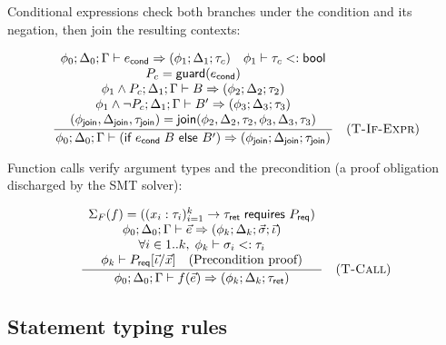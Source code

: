 Conditional expressions check both branches under the condition and its negation, then join the resulting contexts:

$$
  \frac{
    \begin{array}{c}
      \phi_0; \Delta_0; \Gamma \vdash e_\textsf{cond} \Rightarrow (\phi_1; \Delta_1; \tau_c) \quad \phi_1 \vdash \tau_c <: \textsf{bool} \\
      P_c = \mathsf{guard}(e_\textsf{cond}) \\
      \phi_1 \wedge P_c; \Delta_1; \Gamma \vdash B \Rightarrow (\phi_2; \Delta_2; \tau_2)                      \\
      \phi_1 \wedge \neg P_c; \Delta_1; \Gamma \vdash B' \Rightarrow (\phi_3; \Delta_3; \tau_3)                \\
      (\phi_\textsf{join}, \Delta_\textsf{join}, \tau_\textsf{join}) = \textsf{join}(\phi_2, \Delta_2, \tau_2, \phi_3, \Delta_3, \tau_3)
    \end{array}
  }{
    \phi_0; \Delta_0; \Gamma \vdash (\textsf{if } e_\textsf{cond}\; B \textsf{ else } B') \Rightarrow (\phi_\textsf{join}; \Delta_\textsf{join}; \tau_\textsf{join})
  } \quad (\textsc{T-If-Expr})
$$

Function calls verify argument types and the precondition (a proof obligation discharged by the SMT solver):

$$
  \frac{
    \begin{array}{c}
      \Sigma_F(f) = ( (x_i:\tau_i)_{i=1}^k \rightarrow \tau_\textsf{ret}\; \textsf{requires } P_\textsf{req} )                                  \\
      \phi_0; \Delta_0; \Gamma \vdash \vec{e} \Rightarrow (\phi_k; \Delta_k; \vec{\sigma}; \vec{\iota}) \\
      \forall i \in 1..k,\; \phi_k \vdash \sigma_i <: \tau_i                                                \\
      \phi_k \vdash P_\textsf{req}[\vec{\iota} / \vec{x}] \quad \text{(Precondition proof)}
    \end{array}
  }{
    \phi_0; \Delta_0; \Gamma \vdash f(\vec{e}) \Rightarrow (\phi_k; \Delta_k; \tau_\textsf{ret})
  } \quad (\textsc{T-Call})
$$

\subsection{Statement typing rules}\label{sec:stmt-typing-rules}

